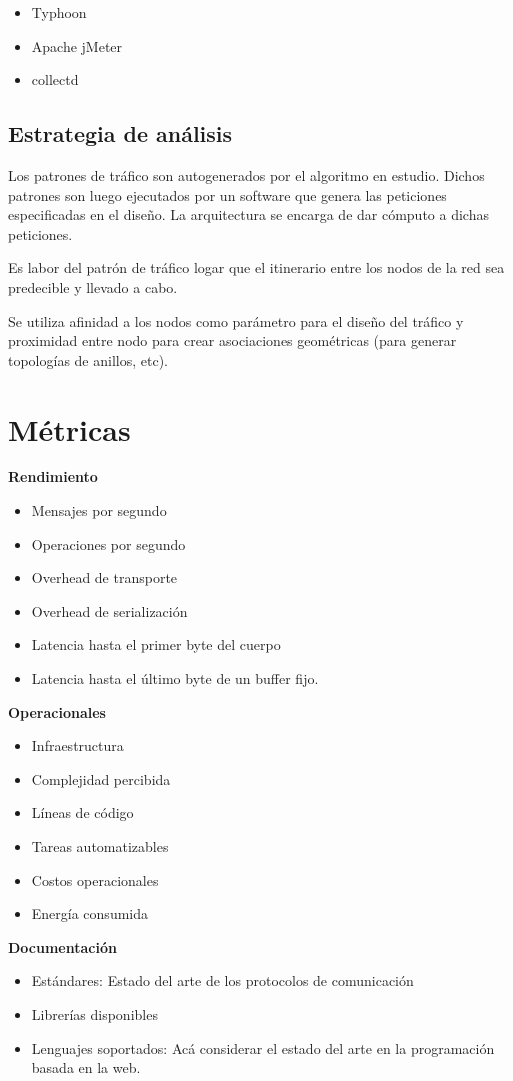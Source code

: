 \begin{itemize}
  \item Typhoon
  \item Apache jMeter
  \item collectd
\end{itemize}

\subsection{Estrategia de análisis}

Los patrones de tráfico son autogenerados por el algoritmo en estudio. Dichos patrones son luego ejecutados por un software que genera las peticiones especificadas en el diseño. La arquitectura se encarga de dar cómputo a dichas peticiones.

Es labor del patrón de tráfico logar que el itinerario entre los nodos de la red sea predecible y llevado a cabo.

Se utiliza afinidad a los nodos como parámetro para el diseño del tráfico y proximidad entre nodo para crear asociaciones geométricas (para generar topologías de anillos, etc).

\section{Métricas} %
\label{sec:métricas}



\textbf{Rendimiento}

\begin{itemize}
  \item Mensajes por segundo
  \item Operaciones por segundo
  \item Overhead de transporte
  \item Overhead de serialización
  \item Latencia hasta el primer byte del cuerpo
  \item Latencia hasta el último byte de un buffer fijo.
\end{itemize}

\textbf{Operacionales}
\begin{itemize}
  \item Infraestructura
  \item Complejidad percibida
  \item Líneas de código
  \item Tareas automatizables
  \item Costos operacionales
  \item Energía consumida
\end{itemize}

\textbf{Documentación}
\begin{itemize}
  \item Estándares: Estado del arte de los protocolos de comunicación
  \item Librerías disponibles
  \item Lenguajes soportados: Acá considerar el estado del arte en la programación basada en la web.
\end{itemize}